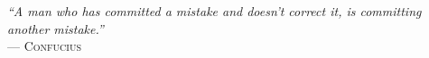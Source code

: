 \documentclass[../infufrgs/ppgc-tese.tex]{subfiles}
\begin{document}
\begin{flushright}
\mbox{}%
{\sffamily\itshape
``A man who has committed a mistake and doesn’t correct it, is committing another mistake.'' \\}
--- \textsc{Confucius}
\end{flushright}
\end{document}
